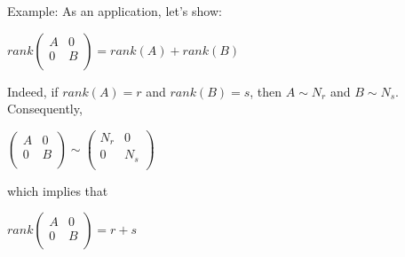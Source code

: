 \documentclass[UTF8,a4paper,11pt]{amsbook}
\begin{document}
Example:
As an application, let's show:
\begin{center}
$rank
\begin{pmatrix}
A & 0 \\
0 & B \\
\end{pmatrix}
= rank(A)+rank(B)$
\end{center}
Indeed, if $rank(A)=r$ and $rank(B)=s$, then $A\sim N_r$ and $B\sim N_s$.\\
Consequently, 
\begin{center}
$\begin{pmatrix}
A & 0 \\
0 & B \\
\end{pmatrix}\sim 
\begin{pmatrix}
N_r & 0 \\
0 & N_s \\
\end{pmatrix}$
\end{center}
which implies that
\begin{center}
$rank 
\begin{pmatrix}
A & 0 \\
0 & B \\
\end{pmatrix}=r+s$
\end{center}
\end{document}

